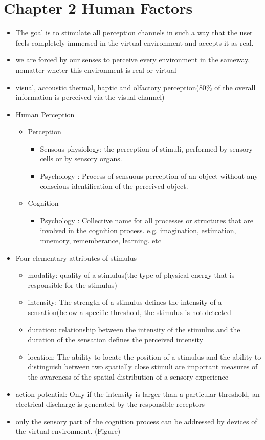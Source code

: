 \documentclass{standalone}
\begin{document}
\section{Chapter 2 Human Factors}
\begin{itemize}
	\item The goal is to stimulate all perception channels in such a way that the user feels completely immersed in the virtual environment and accepts it as real.
	\item we are forced by our senses to perceive every environment in the sameway, nomatter wheter this environment is real or virtual
	\item visual, accoustic thermal, haptic and olfactory perception($80 \%$ of the overall information is perceived via the visual channel)
	\item Human Perception
	\begin{itemize}
		\item Perception
		\begin{itemize}
			\item Sensous physiology: the perception of stimuli, performed by sensory cells or by sensory organs.
			\item Psychology : Process of sensuous perception of an object without any conscious identification of the perceived object.
		\end{itemize}
		\item Cognition
		\begin{itemize}
			\item Psychology : Collective name for all processes or structures that are involved in the cognition process. e.g. imagination, estimation, mnemory, rememberance, learning. etc
		\end{itemize}
	\end{itemize}
	\item Four elementary attributes of stimulus
	\begin{itemize}
		\item modality: quality of a stimulus(the type of physical energy that is responsible for the stimulus)
		\item intensity: The strength of a stimulus defines the intensity of a sensation(below a specific threshold, the stimulus is not detected
		\item duration: relationship between the intensity of the stimulus and the duration of the sensation defines the perceived intensity
		\item location: The ability to locate the position of a stimulus and the ability to distinguish between two spatially close stimuli are important measures of the awareness of the spatial distribution of a sensory experience
	\end{itemize}
	\item action potential: Only if the intensity is larger than a particular threshold, an electrical discharge is generated by the responsible receptors
	\item only the sensory part of the cognition process can be addressed by devices of the virtual environment. (Figure)
\end{itemize}
\end{document}
